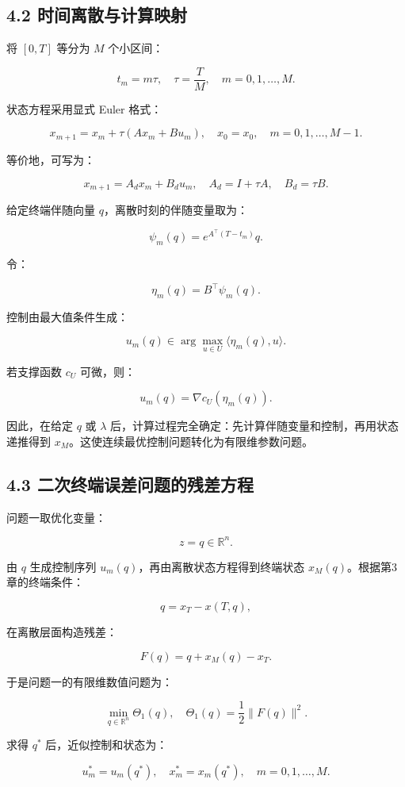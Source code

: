\documentclass[UTF8,a4paper,zihao=-4]{ctexart}
\begin{document}
\subsection{4.2 时间离散与计算映射}

将 $[0,T]$ 等分为 $M$ 个小区间：

\[
t_m=m\tau,\quad \tau=\frac{T}{M},\quad m=0,1,\ldots,M.
\]

状态方程采用显式 Euler 格式：

\[
x_{m+1}=x_m+\tau(Ax_m+Bu_m),\quad x_0=x_0,\quad m=0,1,\ldots,M-1.
\]

等价地，可写为：

\[
x_{m+1}=A_dx_m+B_du_m,\quad A_d=I+\tau A,\quad B_d=\tau B.
\]

给定终端伴随向量 $q$，离散时刻的伴随变量取为：

\[
\psi_m(q)=e^{A^\top(T-t_m)}q.
\]

令：

\[
\eta_m(q)=B^\top\psi_m(q).
\]

控制由最大值条件生成：

\[
u_m(q)\in\arg\max_{u\in U}\langle \eta_m(q),u\rangle.
\]

若支撑函数 $c_U$ 可微，则：

\[
u_m(q)=\nabla c_U(\eta_m(q)).
\]

因此，在给定 $q$ 或 $\lambda$ 后，计算过程完全确定：先计算伴随变量和控制，再用状态递推得到 $x_M$。这使连续最优控制问题转化为有限维参数问题。

\subsection{4.3 二次终端误差问题的残差方程}

问题一取优化变量：

\[
z=q\in\mathbb{R}^n.
\]

由 $q$ 生成控制序列 $u_m(q)$，再由离散状态方程得到终端状态 $x_M(q)$。根据第3章的终端条件：

\[
q=x_T-x(T,q),
\]

在离散层面构造残差：

\[
F(q)=q+x_M(q)-x_T.
\]

于是问题一的有限维数值问题为：

\[
\min_{q\in\mathbb{R}^n}\Theta_1(q),\quad
\Theta_1(q)=\frac{1}{2}\|F(q)\|^2.
\]

求得 $q^*$ 后，近似控制和状态为：

\[
u_m^*=u_m(q^*),\quad x_m^*=x_m(q^*),\quad m=0,1,\ldots,M.
\]
\end{document}
